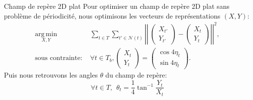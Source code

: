 \documentclass{beamer}
\DeclareMathOperator*{\argmin}{arg\,min}
\begin{document}
\begin{frame}{Champ de repère 2D plat}
    \small
    Pour optimiser un champ de repère 2D plat sans problème de périodicité, nous optimisons 
    les vecteurs de représentations $(X, Y)$:
    \small{
    \begin{equation*}
    \begin{array}{ll}
    \underset{X, Y}{\argmin} & \underset{t \in T}{\displaystyle\sum} \underset{t' \in \mathcal{N}(t)}{\displaystyle\sum} \left|\left|\ \begin{pmatrix} X_{t'}\\ Y_{t'}\end{pmatrix} - \begin{pmatrix} X_{t}\\ Y_{t}\end{pmatrix} \right|\right|^2, \\
    \text{sous contrainte: } & \forall t \in T_b, \begin{pmatrix} X_{t}\\ Y_{t}\end{pmatrix} = \begin{pmatrix} \cos4\eta_t\\ \sin4\eta_t\end{pmatrix}.
    \end{array}
    \end{equation*}
    }
    Puis nous retrouvons les angles $\theta$ du champ de repère:
    $$ \forall t \in T,\ \  \theta_t = \frac{1}{4}\tan^{-1}\frac{Y_t}{X_t}$$

\end{frame}
\end{document}
